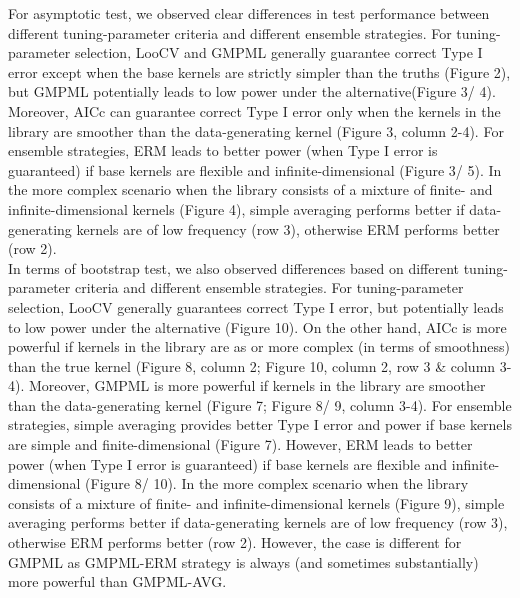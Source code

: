 \documentclass[11pt]{article}
\begin{document}
For asymptotic test, we observed clear differences in test performance between different tuning-parameter criteria and different ensemble strategies. For tuning-parameter selection, LooCV and GMPML generally guarantee correct Type I error except when the base kernels are strictly simpler than the truths (Figure 2), but GMPML potentially leads to low power under the alternative(Figure 3/ 4). Moreover, AICc can guarantee correct Type I error only when the kernels in the library are smoother than the data-generating kernel (Figure 3, column 2-4). For ensemble strategies, ERM leads to better power (when Type I error is guaranteed) if base kernels are flexible and infinite-dimensional (Figure 3/ 5). In the more complex scenario when the library consists of a mixture of finite- and infinite-dimensional kernels (Figure 4), simple averaging performs better if data-generating kernels are of low frequency (row 3), otherwise ERM performs better (row 2).\\

In terms of bootstrap test, we also observed differences based on different tuning-parameter criteria and different ensemble strategies. For tuning-parameter selection, LooCV generally guarantees correct Type I error, but potentially leads to low power under the alternative (Figure 10). On the other hand, AICc is more powerful if kernels in the library are as or more complex (in terms of smoothness) than the true kernel (Figure 8, column 2; Figure 10, column 2, row 3 \& column 3-4). Moreover, GMPML is more powerful if kernels in the library are smoother than the data-generating kernel (Figure 7; Figure 8/ 9, column 3-4). For ensemble strategies, simple averaging provides better Type I error and power if base kernels are simple and finite-dimensional (Figure 7). However, ERM leads to better power (when Type I error is guaranteed) if base kernels are flexible and infinite-dimensional (Figure 8/ 10). In the more complex scenario when the library consists of a mixture of finite- and infinite-dimensional kernels (Figure 9), simple averaging performs better if data-generating kernels are of low frequency (row 3), otherwise ERM performs better (row 2). However, the case is different for GMPML as GMPML-ERM strategy is always (and sometimes substantially) more powerful than GMPML-AVG.\\
\end{document}
